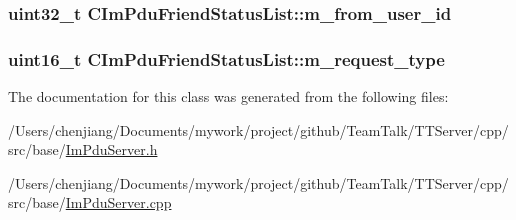 \subsubsection[{m\+\_\+from\+\_\+user\+\_\+id}]{\setlength{\rightskip}{0pt plus 5cm}uint32\+\_\+t C\+Im\+Pdu\+Friend\+Status\+List\+::m\+\_\+from\+\_\+user\+\_\+id\hspace{0.3cm}{\ttfamily [private]}}\label{class_c_im_pdu_friend_status_list_a845020a90bba7df3aab1ba60157cc1b7}
\hypertarget{class_c_im_pdu_friend_status_list_ab5717327cc66f2da138182fd5077e44c}{}
\subsubsection[{m\+\_\+request\+\_\+type}]{\setlength{\rightskip}{0pt plus 5cm}uint16\+\_\+t C\+Im\+Pdu\+Friend\+Status\+List\+::m\+\_\+request\+\_\+type\hspace{0.3cm}{\ttfamily [private]}}\label{class_c_im_pdu_friend_status_list_ab5717327cc66f2da138182fd5077e44c}


The documentation for this class was generated from the following files\+:\begin{DoxyCompactItemize}
\item 
/\+Users/chenjiang/\+Documents/mywork/project/github/\+Team\+Talk/\+T\+T\+Server/cpp/src/base/\hyperlink{_im_pdu_server_8h}{Im\+Pdu\+Server.\+h}\item 
/\+Users/chenjiang/\+Documents/mywork/project/github/\+Team\+Talk/\+T\+T\+Server/cpp/src/base/\hyperlink{_im_pdu_server_8cpp}{Im\+Pdu\+Server.\+cpp}\end{DoxyCompactItemize}
